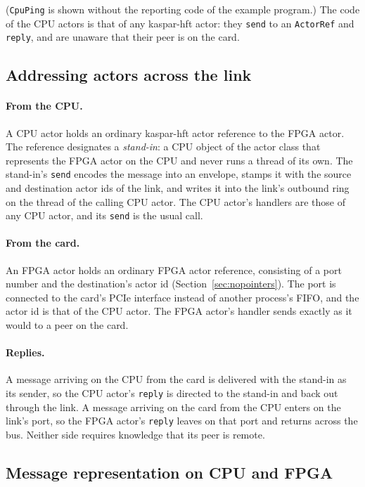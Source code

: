 \documentclass[11pt]{article}
\newcommand{\snd}{\texttt{send}}
\begin{document}
\noindent (\texttt{CpuPing} is shown without the reporting code of the example
program.) The code of the CPU actors is that of any kaspar-hft actor: they
\snd{} to an \texttt{ActorRef} and \texttt{reply}, and are unaware that their
peer is on the card.

\subsection{Addressing actors across the link}
\label{sec:naming}

\paragraph{From the CPU.} A CPU actor holds an ordinary kaspar-hft actor
reference to the FPGA actor. The reference designates a \emph{stand-in}: a CPU
object of the actor class that represents the FPGA actor on the CPU and never
runs a thread of its own. The stand-in's \snd{} encodes the message into an
envelope, stamps it with the source and destination actor ids of the link, and
writes it into the link's outbound ring on the thread of the calling CPU actor.
The CPU actor's handlers are those of any CPU actor, and its \snd{} is the
usual call.

\paragraph{From the card.} An FPGA actor holds an ordinary FPGA actor
reference, consisting of a port number and the destination's actor id
(Section~\ref{sec:nopointers}). The port is connected to the card's PCIe
interface instead of another process's FIFO, and the actor id is that of the
CPU actor. The FPGA actor's handler sends exactly as it would to a peer on the
card.

\paragraph{Replies.} A message arriving on the CPU from the card is delivered
with the stand-in as its sender, so the CPU actor's \texttt{reply} is directed
to the stand-in and back out through the link. A message arriving on the card
from the CPU enters on the link's port, so the FPGA actor's \texttt{reply}
leaves on that port and returns across the bus. Neither side requires
knowledge that its peer is remote.

\subsection{Message representation on CPU and FPGA}
\label{sec:twoforms}
\end{document}
